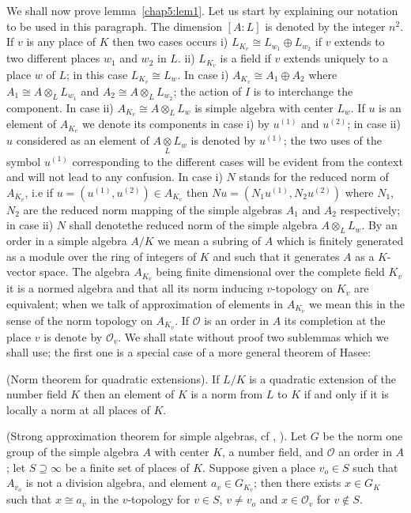We shall now prove lemma~\ref{chap5:lem1}. Let us start by explaining our notation
to be used in this paragraph. The dimension $[A:L]$ is denoted by the
integer $n^2$. If $v$ is any place of $K$ then two cases occurs i)
$L_{K_v} \cong L_{w_1} \oplus L_{w_2}$ if $v$ extends to two different
places $w_1$ and $w_2$ in $L$. ii) $L_{K_v}$ is a field if $v$ extends
uniquely to a
place $w$ of $L$; in this case $L_{K_v} \cong L_w$. In case i)
$A_{K_v}\cong A_1 \oplus A_2$ where $A_1 \cong A \otimes_L L_{w_1}$
and $A_2 \cong A \otimes_L L_{w_2}$; the action of $I$ is to
interchange the component. In case ii) $A_{K_v} \cong A \otimes_L
L_{w}$  is simple algebra with center $L_w$. If $u$ is an element of
$A_{K_v}$ we denote its components in case i)
 by $u^{(1)}$  and
$u^{(2)}$; in case ii) $u$ considered as an element of $A
\underset{L}\otimes L_w$ is denoted by $u^{(1)}$; the two uses of the
symbol $u^{(1)}$ corresponding to the different cases will be
evident from the context and will not lead to any confusion. In case
i) $N$ stands for the reduced norm of $A_{K_v}$, i.e if
$u=(u^{(1)},u^{(2)})\in A_{K_v}$ then $Nu=(N_1u^{(1)},N_2u^{(2)})$
where $N_1$, $N_2$ are the reduced norm mapping of the simple algebras
$A_1$ and $A_2$ respectively; in case ii) $N$ shall
denote\pageoriginale the 
reduced norm of the simple algebra $A \otimes_L L_w$. By an order in a
simple algebra $A/K$ we mean a subring of $A$ which is finitely
generated as a module over the ring of integers of $K$ and such that
it generates $A$ as a $K$-vector space. The algebra $A_{K_v}$ being
finite dimensional over the complete field $K_v$ it is a normed
algebra and that all its norm inducing $v$-topology on $K_v$ are
equivalent; when we talk of approximation of elements in $A_{K_v}$ we
mean this in the sense of the norm topology on $A_{K_v}$. If
$\mathscr{O}$ is an order in $A$ its completion at the place $v$ is
denote by $\mathscr{O}_v$. We shall state without proof two sublemmas
which we shall use; the first one is a special case of a more general
theorem of Hasee:   


\begin{sublema}\label{chap5:sublema}
(Norm theorem for quadratic extensions).
 If $L/K$ is a quadratic extension of the number field $K$ then an
 element of $K$ is a norm from $L$ to $K$ if and only if it is locally a
 norm at all places of 
  $K$. 
\end{sublema}

\begin{sublema}\label{chap5:sublemb}
(Strong approximation theorem for simple algebras, cf \cite{keyE2},
\cite{keyK1}). Let $G$ be the norm one group of the simple algebra $A$
  with center $K$, a number field, and $\mathscr{O}$ an order in $A$;
  let $S \supseteq \infty$ be a finite set of places of $K$. Suppose given a
  place $v_o \in S$  such that $A_{v_o}$ is not a division algebra,
  and element $a_v \in G_{K_v}$; then there exists $x \in G_K$ such that
  $x \cong a_v$ in the $v$-topology for $v \in S$, $v \neq v_o$ and $x
  \in \mathscr{O}_v$ for $v \notin S$. 
\end{sublema}

